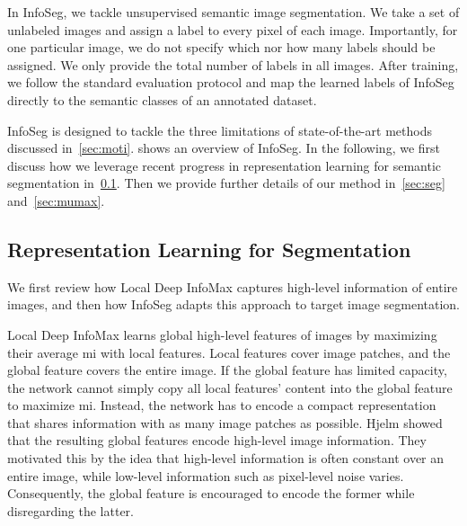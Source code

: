 
In InfoSeg, we tackle unsupervised semantic image segmentation.
We take a set  of  unlabeled images and assign a label  to every pixel of each image.
Importantly, for one particular image, we do not specify which nor how many labels should be assigned.
We only provide the total number of labels  in all images.
After training, we follow the standard evaluation protocol and map the learned labels of InfoSeg directly to the semantic classes of an annotated dataset.


InfoSeg is designed to tackle the three limitations of state-of-the-art methods discussed in~\cref{sec:moti}.
 shows an overview of InfoSeg.
In the following, we first discuss how we leverage recent progress in representation learning for semantic segmentation in~\cref{sec:murep}.
Then we provide further details of our method in~\cref{sec:seg} and~\cref{sec:mumax}.

\subsection{Representation Learning for Segmentation}
\label{sec:murep}

We first review how Local Deep InfoMax \cite{deepinfo} captures high-level information of entire images,
and then how InfoSeg adapts this approach to target image segmentation.

Local Deep InfoMax \cite{deepinfo} learns global high-level features of images by maximizing their average \gls{mi} with local features.
Local features cover image patches, and the global feature covers the entire image.
If the global feature has limited capacity, the network cannot simply copy all local features' content into the global feature to maximize \gls{mi}.
Instead, the network has to encode a compact representation that shares information with as many image patches as possible.
Hjelm \etal \cite{deepinfo} showed that the resulting global features encode high-level image information.
They motivated this by the idea that high-level information is often constant over an entire image, while low-level information such as pixel-level noise varies.
Consequently, the global feature is encouraged to encode the former while disregarding the latter.

